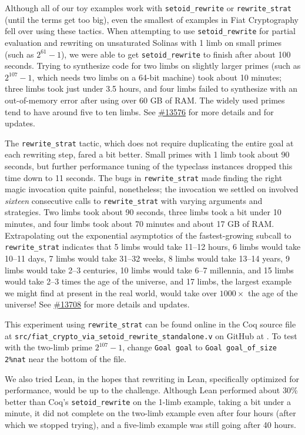 \documentclass[a4paper,USenglish,cleveref,autoref,thm-restate]{lipics-v2021}
\newcommand{\coqbug}[1]{\href{https://github.com/coq/coq/issues/#1}{\##1}}
\begin{document}
\begin{minipage}[t][1cm]{\textwidth}
Although all of our toy examples work with \texttt{setoid\_rewrite} or \texttt{rewrite\_strat} (until the terms get too big), even the smallest of examples in Fiat Cryptography fell over using these tactics.
When attempting to use \texttt{setoid\_rewrite} for partial evaluation and rewriting on unsaturated Solinas with 1 limb on small primes (such as $2^{61}-1$), we were able to get \texttt{setoid\_rewrite} to finish after about 100 seconds.
Trying to synthesize code for two limbs on slightly larger primes (such as $2^{107}-1$, which needs two limbs on a 64-bit machine) took about 10 minutes;
three limbs took just under 3.5 hours, and four limbs failed to synthesize with an out-of-memory error after using over 60 GB of RAM.
The widely used primes tend to have around five to ten limbs.
See \coqbug{13576} for more details and for updates.

The \texttt{rewrite\_strat} tactic, which does not require duplicating the entire goal at each rewriting step, fared a bit better.
Small primes with 1 limb took about 90 seconds, but further performance tuning of the typeclass instances dropped this time down to 11 seconds.
The bugs in \texttt{rewrite\_strat} made finding the right magic invocation quite painful, nonetheless; the invocation we settled on involved \emph{sixteen} consecutive calls to \texttt{rewrite\_strat} with varying arguments and strategies.
Two limbs took about 90 seconds, three limbs took a bit under 10 minutes, and four limbs took about 70 minutes and about 17 GB of RAM.
Extrapolating out the exponential asymptotics of the fastest-growing subcall to \texttt{rewrite\_strat} indicates that 5 limbs would take 11--12 hours, 6 limbs would take 10--11 days, 7 limbs would take 31--32 weeks, 8 limbs would take 13--14 years, 9 limbs would take 2--3 centuries, 10 limbs would take 6--7 millennia, and 15 limbs would take 2--3 times the age of the universe, and 17 limbs, the largest example we might find at present in the real world, would take over $1000\times$ the age of the universe!
See \coqbug{13708} for more details and updates.

This experiment using \verb|rewrite_strat| can be found online in the Coq source file at \texttt{src/fiat\_crypto\_via\_setoid\_rewrite\_standalone.v} on GitHub at .
To test with the two-limb prime $2^{107}-1$, change \verb|Goal goal| to \verb|Goal goal_of_size 2%nat| near the bottom of the file.

We also tried Lean, in the hopes that rewriting in Lean, specifically optimized for performance, would be up to the challenge.
Although Lean performed about 30\% better than Coq's \texttt{setoid\_rewrite} on the 1-limb example, taking a bit under a minute, it did not complete on the two-limb example even after four hours (after which we stopped trying), and a five-limb example was still going after 40 hours.


\end{minipage}
\end{document}
